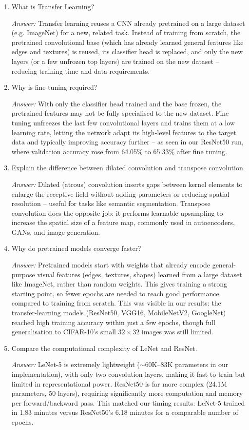 \documentclass[11pt]{article}
\begin{document}
\begin{enumerate}
\item What is Transfer Learning?

\textit{Answer:} Transfer learning reuses a CNN already pretrained on a large dataset (e.g. ImageNet) for a new, related task. Instead of training from scratch, the pretrained convolutional base (which has already learned general features like edges and textures) is reused, its classifier head is replaced, and only the new layers (or a few unfrozen top layers) are trained on the new dataset -- reducing training time and data requirements.

\item Why is fine tuning required?

\textit{Answer:} With only the classifier head trained and the base frozen, the pretrained features may not be fully specialised to the new dataset. Fine tuning unfreezes the last few convolutional layers and trains them at a low learning rate, letting the network adapt its high-level features to the target data and typically improving accuracy further -- as seen in our ResNet50 run, where validation accuracy rose from 64.05\% to 65.33\% after fine tuning.

\item Explain the difference between dilated convolution and transpose convolution.

\textit{Answer:} Dilated (atrous) convolution inserts gaps between kernel elements to enlarge the receptive field without adding parameters or reducing spatial resolution -- useful for tasks like semantic segmentation. Transpose convolution does the opposite job: it performs learnable upsampling to increase the spatial size of a feature map, commonly used in autoencoders, GANs, and image generation.

\item Why do pretrained models converge faster?

\textit{Answer:} Pretrained models start with weights that already encode general-purpose visual features (edges, textures, shapes) learned from a large dataset like ImageNet, rather than random weights. This gives training a strong starting point, so fewer epochs are needed to reach good performance compared to training from scratch. This was visible in our results: the transfer-learning models (ResNet50, VGG16, MobileNetV2, GoogleNet) reached high training accuracy within just a few epochs, though full generalisation to CIFAR-10's small $32\times32$ images was still limited.

\item Compare the computational complexity of LeNet and ResNet.

\textit{Answer:} LeNet-5 is extremely lightweight ($\sim$60K--83K parameters in our implementation), with only two convolution layers, making it fast to train but limited in representational power. ResNet50 is far more complex (24.1M parameters, 50 layers), requiring significantly more computation and memory per forward/backward pass. This matched our timing results: LeNet-5 trained in 1.83 minutes versus ResNet50's 6.18 minutes for a comparable number of epochs.

\end{enumerate}
\end{document}
